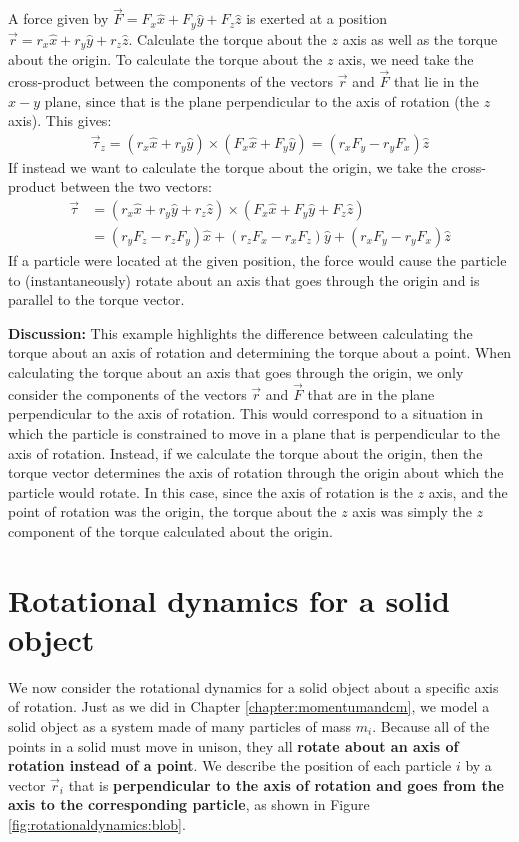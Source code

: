 \begin{example}{A force given by $\vec F=F_x\hat x + F_y \hat y + F_z \hat z$ is exerted at a position $\vec r=r_x \hat x + r_y \hat y + r_z\hat z$. Calculate the torque about the $z$ axis as well as the torque about the origin.}
To calculate the torque about the $z$ axis, we need take the cross-product between the components of the vectors $\vec r$ and $\vec F$ that lie in the $x-y$ plane, since that is the plane perpendicular to the axis of rotation (the $z$ axis). This gives:
\begin{align*}
\vec\tau_z =(r_x \hat x + r_y \hat y) \times (F_x\hat x + F_y \hat y) =(r_xF_y-r_yF_x)\hat z
\end{align*}
If instead we want to calculate the torque about the origin, we take the cross-product between the two vectors:
\begin{align*}
\vec\tau &=(r_x \hat x + r_y \hat y+ r_z\hat z) \times (F_x\hat x + F_y \hat y+ F_z \hat z)\\
&=(r_yF_z-r_zF_y)\hat x+(r_zF_x-r_xF_z)\hat y+(r_xF_y-r_yF_x)\hat z
\end{align*}
If a particle were located at the given position, the force would cause the particle to (instantaneously) rotate about an axis that goes through the origin and is parallel to the torque vector. 

\textbf{Discussion:} This example highlights the difference between calculating the torque about an axis of rotation and determining the torque about a point. When calculating the torque about an axis that goes through the origin, we only consider the components of the vectors $\vec r$ and $\vec F$ that are in the plane perpendicular to the axis of rotation. This would correspond to a situation in which the particle is constrained to move in a plane that is perpendicular to the axis of rotation. Instead, if we calculate the torque about the origin, then the torque vector determines the axis of rotation through the origin about which the particle would rotate. In this case, since the axis of rotation is the $z$ axis, and the point of rotation was the origin, the torque about the $z$ axis was simply the $z$ component of the torque calculated about the origin.
\end{example}


\section{Rotational dynamics for a solid object}
We now consider the rotational dynamics for a solid object about a specific axis of rotation. Just as we did in Chapter \ref{chapter:momentumandcm}, we model a solid object as a system made of many particles of mass $m_i$. Because all of the points in a solid must move in unison, they all \textbf{rotate about an axis of rotation instead of a point}. We describe the position of each particle $i$ by a vector $\vec r_i$ that is \textbf{perpendicular to the axis of rotation and goes from the axis to the corresponding particle}, as shown in Figure \ref{fig:rotationaldynamics:blob}.

